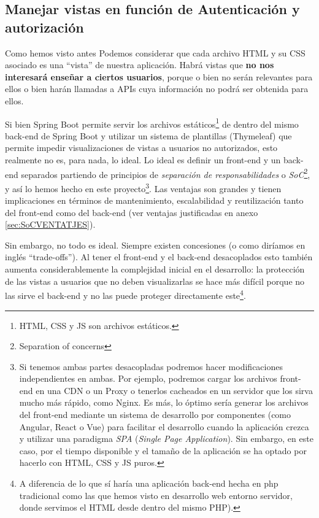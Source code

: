 \documentclass[a4paper,12pt]{report}
\begin{document}
	
	
	
	
	
	
	
	\subsection{Manejar vistas en función de Autenticación y autorización}
	
	
	Como hemos visto antes Podemos considerar que cada archivo HTML y su CSS asociado es una ``vista'' de nuestra aplicación. Habrá vistas que \textbf{no nos interesará enseñar a ciertos usuarios}, porque o bien no serán relevantes para ellos o bien harán llamadas a APIs cuya información no podrá ser obtenida para ellos.
	
	Si bien Spring Boot permite servir los archivos estáticos\footnote{HTML, CSS y JS son archivos estáticos.}  de dentro del mismo back-end de Spring Boot y utilizar un sistema de plantillas (Thymeleaf) que permite impedir visualizaciones de vistas a usuarios no autorizados, esto realmente no es, para nada, lo ideal. Lo ideal es definir un front-end y un back-end separados partiendo de principios de \textit{separación de responsabilidades} o \textit{SoC}\footnote{Separation of concerns}, y así lo hemos hecho en este proyecto\footnote{Si tenemos ambas partes desacopladas podremos hacer modificaciones independientes en ambas. Por ejemplo, podremos cargar los archivos front-end en una CDN o un Proxy o tenerlos cacheados en un servidor que los sirva mucho más rápido, como Nginx. Es más, lo óptimo sería generar los archivos del front-end mediante un sistema de desarrollo por componentes (como Angular, React o Vue) para facilitar el desarrollo cuando la aplicación crezca y utilizar una paradigma \textit{SPA} (\textit{Single Page Application}). Sin embargo, en este caso, por el tiempo disponible y el tamaño de la aplicación se ha optado por hacerlo con HTML, CSS y JS puros.}. Las ventajas son grandes y tienen implicaciones en términos de mantenimiento, escalabilidad y reutilización tanto del front-end como del back-end (ver ventajas justificadas en anexo \ref{sec:SoCVENTATJES}).
	

	
	
	
	
	Sin embargo, no todo es ideal. Siempre existen concesiones (o como diríamos en inglés ``trade-offs''). Al tener el front-end y el back-end desacoplados esto también aumenta considerablemente la complejidad inicial en el desarrollo: la protección de las vistas a usuarios que no deben visualizarlas se hace más difícil porque no las sirve el back-end y no las puede proteger directamente este\footnote{A diferencia de lo que sí haría una aplicación back-end hecha en php tradicional como las que hemos visto en desarrollo web entorno servidor, donde servimos el HTML desde dentro del mismo PHP).}.
	
\end{document}
